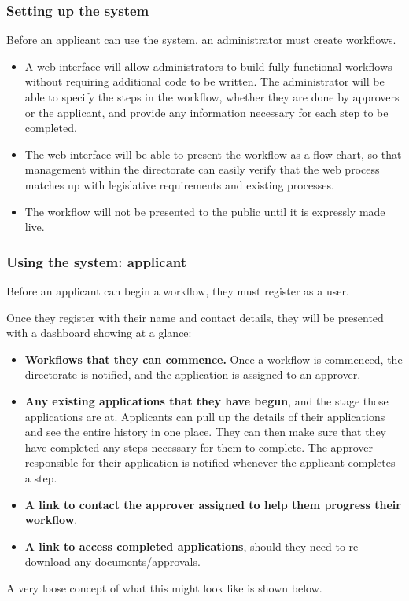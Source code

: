 \documentclass[12pt]{article}
\begin{document}
\subsubsection{Setting up the system}

Before an applicant can use the system, an administrator must create
workflows. 
\begin{itemize}
\item A web interface will allow administrators to build fully
  functional workflows without requiring additional code to be
  written. The administrator will be able to specify the steps in the
  workflow, whether they are done by approvers or the applicant, and
  provide any information necessary for each step to be completed.
\item The web interface will be able to present the workflow as a flow
  chart, so that management within the directorate can easily verify
  that the web process matches up with legislative requirements and
  existing processes. 
\item The workflow will not be presented to the public until it is
  expressly made live.
\end{itemize}

\subsubsection{Using the system: applicant}

Before an applicant can begin a workflow, they must register as a user.

Once they register with their name and contact details, they will be
presented with a dashboard showing at a glance: 
\begin{itemize}
\item \textbf{Workflows that they can commence.} Once a workflow is
  commenced, the directorate is notified, and the application is
  assigned to an approver. 
\item \textbf{Any existing applications that they have begun}, and the
  stage those applications are at. Applicants can pull up the details
  of their applications and see the entire history in one place. They
  can then make sure that they have completed any steps necessary for
  them to complete.  The approver responsible for their application is
  notified whenever the applicant completes a step. 
\item \textbf{A link to contact the approver assigned to help them
    progress their workflow}. 
\item \textbf{A link to access completed applications}, should they
  need to re-download any documents/approvals.
\end{itemize}
A very loose concept of what this might look like is shown below.
\end{document}
